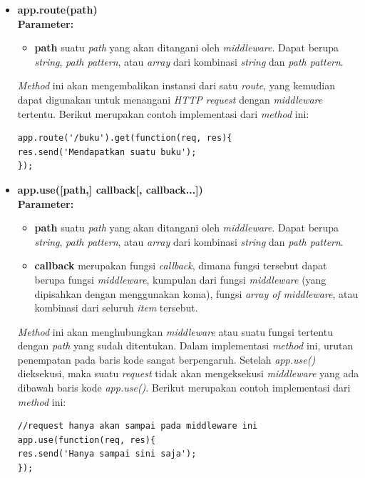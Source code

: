 \documentclass[a4paper,twoside]{article}
\begin{document}
\begin{enumerate}
\begin{enumerate}
\begin{itemize}
				\item \textbf{app.route(path)} \\ \textbf{Parameter:}
				\begin{itemize}
					\item \textbf{path} suatu \textit{path} yang akan ditangani oleh \textit{middleware}. Dapat berupa \textit{string}, \textit{path pattern}, atau \textit{array} dari kombinasi \textit{string} dan \textit{path pattern}.
				\end{itemize}
				
				\textit{Method} ini akan mengembalikan instansi dari satu \textit{route}, yang kemudian dapat digunakan untuk menangani \textit{HTTP request} dengan \textit{middleware} tertentu. Berikut merupakan contoh implementasi dari \textit{method} ini:
\begin{lstlisting}
app.route('/buku').get(function(req, res){
res.send('Mendapatkan suatu buku');
});
\end{lstlisting}
				
				\item \textbf{app.use([path,] callback[, callback...])} \\ \textbf{Parameter:} 
				\begin{itemize}
					\item \textbf{path} suatu \textit{path} yang akan ditangani oleh \textit{middleware}. Dapat berupa \textit{string}, \textit{path pattern}, atau \textit{array} dari kombinasi \textit{string} dan \textit{path pattern}.
					
					\item \textbf{callback} merupakan fungsi \textit{callback}, dimana fungsi tersebut dapat berupa fungsi \textit{middleware}, kumpulan dari fungsi \textit{middleware} (yang dipisahkan dengan menggunakan koma), fungsi \textit{array of middleware}, atau kombinasi dari seluruh \textit{item} tersebut.
				\end{itemize}
				
				\textit{Method} ini akan menghubungkan \textit{middleware} atau suatu fungsi tertentu dengan \textit{path} yang sudah ditentukan. Dalam implementasi \textit{method} ini, urutan penempatan pada baris kode sangat berpengaruh. Setelah \textit{app.use()} dieksekusi, maka suatu \textit{request} tidak akan mengeksekusi \textit{middleware} yang ada dibawah baris kode \textit{app.use()}.  Berikut merupakan contoh implementasi dari \textit{method} ini:
\begin{lstlisting}
//request hanya akan sampai pada middleware ini
app.use(function(req, res){
res.send('Hanya sampai sini saja');
});
				

\end{lstlisting}
\end{itemize}
\end{enumerate}
\end{enumerate}
\end{document}
